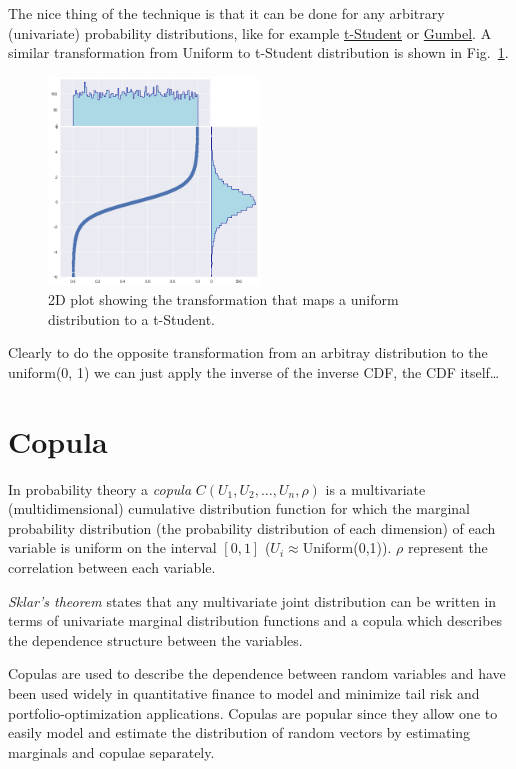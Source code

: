 The nice thing of the technique is that it can be
done for any arbitrary (univariate) probability distributions, like for
example \href{https://en.wikipedia.org/wiki/Student\%27s\_t-distribution}{t-Student}
or \href{https://en.wikipedia.org/wiki/Gumbel_distribution}{Gumbel}.
A similar transformation from Uniform to t-Student distribution is shown in Fig.~\ref{fig:uniform_to_tstudent}.

\begin{figure}[htb]
  \centering
  \includegraphics[width=0.5\textwidth]{copula_files/copula_11_0.png}
  \caption{2D plot showing the transformation that maps a uniform distribution to a t-Student.}
  \label{fig:uniform_to_tstudent}
\end{figure}

    Clearly to do the opposite transformation from an arbitray distribution
to the uniform(0, 1) we can just apply the inverse of the inverse CDF,
the CDF itself\ldots{}


\section{Copula}\label{copula}

In probability theory a \emph{copula} \(C(U_1, U_2, \ldots, U_n, \rho)\)
is a multivariate (multidimensional) cumulative distribution function
for which the marginal probability distribution (the probability
distribution of each dimension) of each variable is uniform on the
interval \([0, 1]\) (\(U_i \approx\)Uniform(0,1)).
\(\rho\) represent the correlation between each variable.

\emph{Sklar's theorem} states that any multivariate joint distribution
can be written in terms of univariate marginal distribution functions
and a copula which describes the dependence structure between the
variables.

Copulas are used to describe the dependence between random variables and
have been used widely in quantitative finance to model and minimize tail
risk and portfolio-optimization applications. Copulas are popular since
they allow one to easily model and estimate the distribution of random
vectors by estimating marginals and copulae separately.

